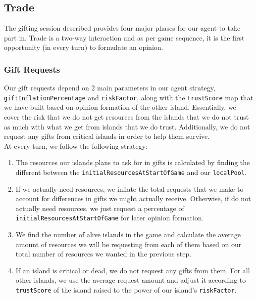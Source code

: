 \documentclass{article}
\begin{document}
\subsection{Trade}

The gifting session described provides four major phases for our agent to take part in. Trade is a two-way interaction and as per game sequence, it is the first opportunity (in every turn) to formulate an opinion.

\subsubsection{Gift Requests}
Our gift requests depend on 2 main parameters in our agent strategy, \texttt{giftInflationPercentage} and \texttt{riskFactor}, along with the \texttt{trustScore} map that we have built based on opinion formation of the other island. Essentially, we cover the risk that we do not get resources from the islands that we do not trust as much with what we get from islands that we do trust. Additionally, we do not request any gifts from critical islands in order to help them survive. \\

At every turn, we follow the following strategy:

\begin{enumerate}
    \item The resources our islands plans to ask for in gifts is calculated by finding the different between the \texttt{initialResourcesAtStartOfGame} and our \texttt{localPool}.
    \item If we actually need resources, we inflate the total requests that we make to account for differences in gifts we might actually receive. Otherwise, if do not actually need resources, we just request a percentage of \texttt{initialResourcesAtStartOfGame} for later opinion formation.
    \item We find the number of alive islands in the game and calculate the average amount of resources we will be requesting from each of them based on our total number of resources we wanted in the previous step.
    \item If an island is critical or dead, we do not request any gifts from them. For all other islands, we use the average request amount and adjust it according to \texttt{trustScore} of the island raised to the power of our island's \texttt{riskFactor}.
\end{enumerate}
\end{document}
